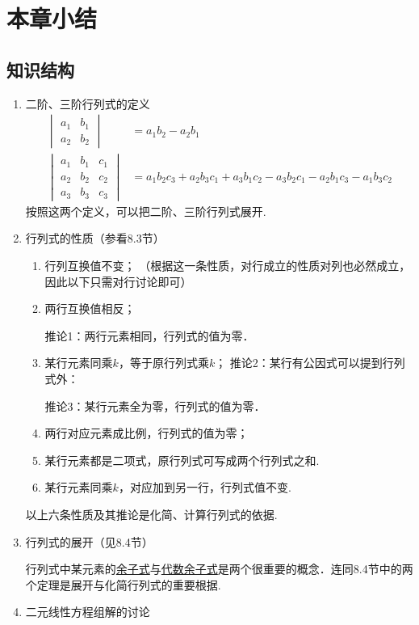\section{本章小结}

\subsection*{知识结构}
\begin{enumerate}
  \item 二阶、三阶行列式的定义
\[\begin{split}
  \begin{vmatrix}
    a_1&b_1\\a_2&b_2
  \end{vmatrix}&=a_1b_2-a_2b_1\\
  \begin{vmatrix}
    a_1&b_1&c_1\\a_2&b_2&c_2\\
    a_3&b_3&c_3
  \end{vmatrix}&=a_1b_2c_3+a_2b_3c_1+a_3b_1c_2-a_3b_2c_1-a_2b_1c_3-a_1b_3c_2
\end{split}\]
按照这两个定义，可以把二阶、三阶行列式展开.
\item 行列式的性质（参看8.3节）
\begin{enumerate}[(1)]
  \item 行列互换值不变；
（根据这一条性质，对行成立的性质对列也必然成立，因此以下只需对行讨论即可）
\item 两行互换值相反；

推论1：两行元素相同，行列式的值为零．
\item 某行元素同乘$k$，等于原行列式乘$k$；
推论2：某行有公因式可以提到行列式外：

推论3：某行元素全为零，行列式的值为零．
\item 两行对应元素成比例，行列式的值为零；
\item 某行元素都是二项式，原行列式可写成两个行列式之和.
\item 某行元素同乘$k$，对应加到另一行，行列式值不变.
\end{enumerate}
以上六条性质及其推论是化简、计算行列式的依据.
\item 行列式的展开（见8.4节）

行列式中某元素的\underline{余子式}与\underline{代数余子式}是两个很重要的概念．连同8.4节中的两个定理是展开与化简行列式的重要根据.
\item 二元线性方程组解的讨论


\end{enumerate}

